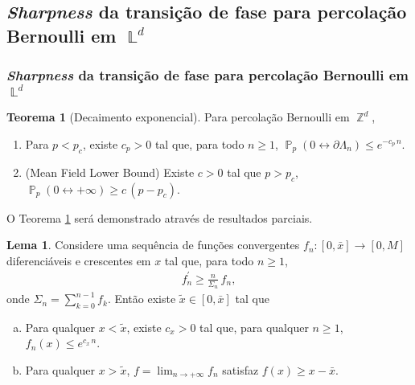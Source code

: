 \documentclass[9pt]{beamer}
\theoremstyle{definition} %
\newtheorem{mythm}{Teorema}
\newtheorem{mylem}{Lema}
\DeclareMathOperator{\PX}{\mathbb{P}} %
\DeclareMathOperator{\ZX}{\mathbb{Z}} %
\DeclareMathOperator{\LX}{\mathbb{L}} %
\begin{document}
	\subsection{\textit{Sharpness} da transição de fase para percolação Bernoulli em $\LX^d$}
	\begin{frame}[t]
		\frametitle{\textit{Sharpness} da transição de fase para percolação Bernoulli em $\LX^d$}
		\begin{mythm}[Decaimento exponencial]\label{thm:decai-exp}
			Para percolação Bernoulli em $\ZX^d$,
			\begin{enumerate}
				\item Para $p < p_c$, existe $c_p > 0$ tal que, para todo $n \geq 1$, $\PX_p(0 \leftrightarrow \partial\Lambda_n) \leq e^{-c_p \, n}$.
				\item (Mean Field Lower Bound) Existe $c > 0$ tal que $p > p_c$, $\PX_p(0 \leftrightarrow +\infty) \geq c\,(p - p_c)$.
			\end{enumerate}
		\end{mythm}\pause
		\vspace{-3pt}
		
		O Teorema \ref{thm:decai-exp} será demonstrado através de resultados parciais.
		\begin{mylem}\label{lem:analise}
			Considere uma sequência de funções convergentes $f_n: [0, \bar{x}] \to [0, M]$ diferenciáveis e crescentes em $x$ tal que, para todo $n \geq 1$,
			\begin{align*}
			f_n^{\prime} \geq \frac{n}{\Sigma_n} \, f_n,
			\end{align*}
			onde $\Sigma_n = \sum_{k = 0}^{n - 1}f_k$. Então existe $\tilde{x} \in [0, \bar{x}]$ tal que
			\begin{enumerate}[a.]
				\item Para qualquer $x < \tilde{x}$, existe $c_x > 0$ tal que, para qualquer $n \geq 1$, $f_n(x) \leq e^{c_x\,n}$.
				\item Para qualquer $x > \tilde{x}$, $f = \lim_{n \to +\infty} f_n$ satisfaz $f(x) \geq x - \bar{x}$.
			\end{enumerate}
		\end{mylem}
	\end{frame}
\end{document}
